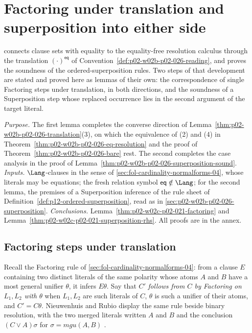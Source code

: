\section{Factoring under translation and superposition into either side}
\label{sec:p02-w02c-p02-021-two-steps}

 connects clause sets with equality to
the equality-free resolution calculus through the translation
\((\cdot)^{\mathsf{eq}}\) of Convention~\ref{def:p02-w02b-p02-026-reading}, and
proves the soundness of the ordered-superposition rules.  Two steps of that
development are stated and proved here as lemmas of their own: the
correspondence of single Factoring steps under translation, in both
directions, and the soundness of a Superposition step whose replaced
occurrence lies in the second argument of the target literal.

\emph{Purpose.}  The first lemma completes the converse direction of
Lemma~\ref{thm:p02-w02b-p02-026-translation}(3), on which the
equivalence of (2) and (4) in
Theorem~\ref{thm:p02-w02b-p02-026-eq-resolution} and the proof of
Theorem~\ref{thm:p02-w02b-p02-026-bare} rest.  The second completes the case
analysis in the proof of
Lemma~\ref{thm:p02-w02b-p02-026-superposition-sound}.
\emph{Inputs.}  \(\Lang\)-clauses in the sense of
\cref{sec:fol-cardinality-normalforms-04}, whose literals may be equations;
the fresh relation symbol \(\mathsf{eq}\notin\Lang\); for the second lemma, the
premises of a Superposition inference of the rule sheet of
Definition~\ref{def:p12-ordered-superposition}, read as in
\cref{sec:p02-w02b-p02-026-superposition}.
\emph{Conclusions.}  Lemma~\ref{thm:p02-w02c-p02-021-factoring} and
Lemma~\ref{thm:p02-w02c-p02-021-superposition-rhs}.  All proofs are in the
annex.

\subsection{Factoring steps under translation}
\label{sec:p02-w02c-p02-021-factoring}

Recall the Factoring rule of \cref{sec:fol-cardinality-normalforms-04}: from
a clause \(E\) containing two distinct literals of the same polarity whose
atoms \(A\) and \(B\) have a most general unifier \(\theta\), it infers
\(E\theta\).  Say that \(C'\) \emph{follows from \(C\) by Factoring on
\(L_1,L_2\) with \(\theta\)} when \(L_1,L_2\) are such literals of \(C\),
\(\theta\) is such a unifier of their atoms, and \(C'=C\theta\).  Nieuwenhuis
and Rubio display the same rule beside binary resolution, with the two
merged literals written \(A\) and \(B\) and the conclusion
\((C\lor A)\sigma\) for \(\sigma=\mathit{mgu}(A,B)\)
\cite[\S1.1, p.~3]{NieuwenhuisRubio2001Typescript}.

